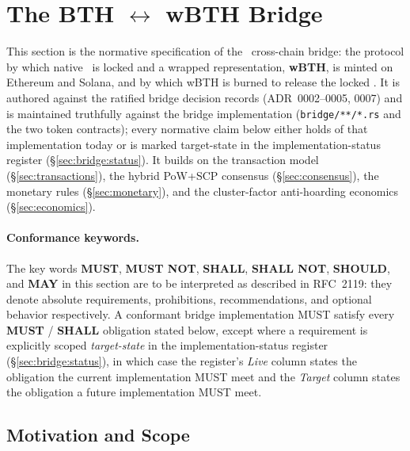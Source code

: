 
\section{The BTH \texorpdfstring{$\leftrightarrow$}{<->} wBTH Bridge}
\label{sec:bridge}

This section is the normative specification of the \Botho\ cross-chain bridge:
the protocol by which native \BTH\ is locked and a wrapped representation,
\textbf{wBTH}, is minted on Ethereum and Solana, and by which wBTH is burned to
release the locked \BTH. It is authored against the ratified bridge
decision records (ADR~0002--0005, 0007) and is maintained truthfully against the
bridge implementation (\texttt{bridge/**/*.rs} and the two token contracts);
every normative claim below either holds of that implementation today or is
marked target-state in the implementation-status register
(\S\ref{sec:bridge:status}). It builds on the transaction model
(\S\ref{sec:transactions}), the hybrid PoW+SCP consensus
(\S\ref{sec:consensus}), the monetary rules (\S\ref{sec:monetary}), and the
cluster-factor anti-hoarding economics (\S\ref{sec:economics}).

\paragraph{Conformance keywords.} The key words \textbf{MUST}, \textbf{MUST
NOT}, \textbf{SHALL}, \textbf{SHALL NOT}, \textbf{SHOULD}, and \textbf{MAY} in
this section are to be interpreted as described in RFC~2119: they denote
absolute requirements, prohibitions, recommendations, and optional behavior
respectively. A conformant bridge implementation MUST satisfy every \textbf{MUST}
/ \textbf{SHALL} obligation stated below, except where a requirement is
explicitly scoped \emph{target-state} in the implementation-status register
(\S\ref{sec:bridge:status}), in which case the register's \emph{Live} column
states the obligation the current implementation MUST meet and the \emph{Target}
column states the obligation a future implementation MUST meet.

\subsection{Motivation and Scope}
\label{sec:bridge:motivation}

